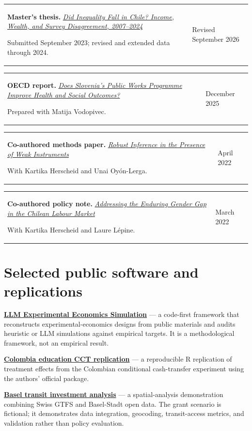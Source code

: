 \documentclass[10pt,letterpaper]{article}
\makeatletter
\newcommand{\cvitem}[2]{%
  \begin{tabularx}{\textwidth}{@{}>{\raggedright\arraybackslash}X>{\raggedleft\arraybackslash}p{1.75in}@{}}
    #1 & \small #2
  \end{tabularx}
}
\newcommand{\cvwideitem}[1]{%
  \noindent#1\par
}
\makeatother
\begin{document}
\cvitem{\textbf{Master's thesis.} \href{https://mkmacho.github.io/assets/camacho-did-inequality-fall-in-chile.pdf}{\textit{Did Inequality Fall in Chile? Income, Wealth, and Survey Disagreement, 2007--2024}}\par{\small Submitted September 2023; revised and extended data through 2024.}}{Revised September 2026}
\par\vspace{5pt}
\cvitem{\textbf{OECD report.} \href{https://www.oecd.org/content/dam/oecd/en/about/projects/technical-reports-and-presentations-dg-reform/slovenia/Module4.pdf}{\textit{Does Slovenia's Public Works Programme Improve Health and Social Outcomes?}}\par{\small Prepared with Matija Vodopivec.}}{December 2025}
\par\vspace{5pt}
\cvitem{\textbf{Co-authored methods paper.} \href{https://mkmacho.github.io/assets/robust-inference-weak-instruments.pdf}{\textit{Robust Inference in the Presence of Weak Instruments}}\par{\small With Kartika Herscheid and Unai Oy\'on-Lerga.}}{April 2022}
\par\vspace{5pt}
\cvitem{\textbf{Co-authored policy note.} \href{https://mkmacho.github.io/assets/addressing-enduring-gender-gap-chilean-labour-market.pdf}{\textit{Addressing the Enduring Gender Gap in the Chilean Labour Market}}\par{\small With Kartika Herscheid and Laure Lépine.}}{March 2022}

\section{Selected public software and replications}

\cvwideitem{\href{https://github.com/mkmacho/llm-experimental-economics-simulation}{\textbf{LLM Experimental Economics Simulation}} — a code-first framework that reconstructs experimental-economics designs from public materials and audits heuristic or LLM simulations against empirical targets. It is a methodological framework, not an empirical result.}
\vspace{6pt}
\cvwideitem{\href{https://github.com/mkmacho/colombia-education-cct-replication}{\textbf{Colombia education CCT replication}} — a reproducible R replication of treatment effects from the Colombian conditional cash-transfer experiment using the authors' official package.}
\vspace{6pt}
\cvwideitem{\href{https://github.com/mkmacho/basel-transit-investment-analysis}{\textbf{Basel transit investment analysis}} — a spatial-analysis demonstration combining Swiss GTFS and Basel-Stadt open data. The grant scenario is fictional; it demonstrates data integration, geocoding, transit-access metrics, and validation rather than policy evaluation.}
\end{document}
